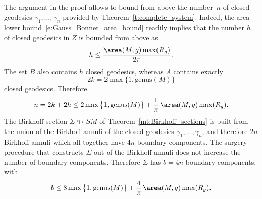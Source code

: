 \begin{Remark}
\label{r:bound_boundary_components}
The argument in the proof allows to bound from above the number~$n$ of closed geodesics $\gamma_1,\dots,\gamma_n$ provided by Theorem~\ref{t:complete_system}. Indeed, the area lower bound~\eqref{e:Gauss_Bonnet_area_bound} readily implies that the number $h$ of closed geodesics in $Z$ is bounded from above as
\begin{align*}
h \leq \frac{\area(M,g)\max(R_g)}{2\pi}.
\end{align*}
The set $B$ also contains $h$ closed geodesics, whereas $A$ contains exactly \[
2k=2\max\big\{1,\mathrm{genus}(M)\big\}
\] closed geodesics. Therefore
\begin{align*}
n
=
2k+2h
\leq 2\max\big\{1,\mathrm{genus}(M)\big\}+\frac{1}{\pi}\,\area(M,g)\max(R_g).
\end{align*}
The Birkhoff section $\Sigma\looparrowright SM$ of Theorem~\ref{mt:Birkhoff_sections} is built from the union of the Birkhoff annuli of the closed geodesics $\gamma_1,\dots,\gamma_n$, and therefore $2n$ Birkhoff annuli which all together have $4n$ boundary components. The surgery procedure that constructs $\Sigma$ out of the Birkhoff annuli does not increase the number of boundary components. Therefore $\Sigma$ has $b=4n$ boundary components, with
\begin{align*}
b
\leq
8\max\big\{1,\mathrm{genus}(M)\big\}+\frac{4}{\pi}\,\area(M,g)\max(R_g).
\end{align*}
\end{Remark}
